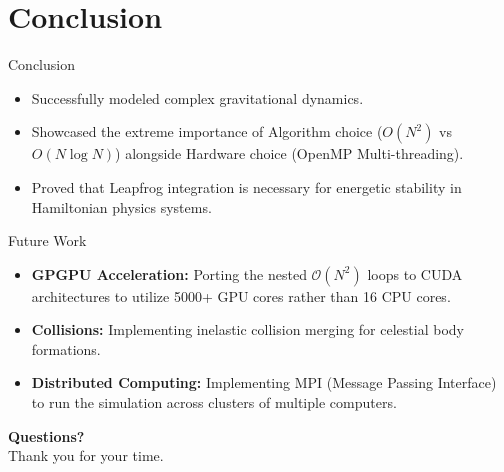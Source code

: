 \documentclass[aspectratio=169]{beamer}
\begin{document}
\section{Conclusion}
\begin{frame}{Conclusion}
    \begin{itemize}
        \item Successfully modeled complex gravitational dynamics.
        \item Showcased the extreme importance of Algorithm choice ($O(N^2)$ vs $O(N \log N)$) alongside Hardware choice (OpenMP Multi-threading).
        \item Proved that Leapfrog integration is necessary for energetic stability in Hamiltonian physics systems.
    \end{itemize}
\end{frame}

\begin{frame}{Future Work}
    \begin{itemize}
        \item \textbf{GPGPU Acceleration:} Porting the nested $\mathcal{O}(N^2)$ loops to CUDA architectures to utilize 5000+ GPU cores rather than 16 CPU cores.
        \item \textbf{Collisions:} Implementing inelastic collision merging for celestial body formations.
        \item \textbf{Distributed Computing:} Implementing MPI (Message Passing Interface) to run the simulation across clusters of multiple computers.
    \end{itemize}
\end{frame}

\begin{frame}
    \centering
    \Huge \textbf{Questions?} \\
    \vspace{1cm}
    \large Thank you for your time.
\end{frame}
\end{document}
